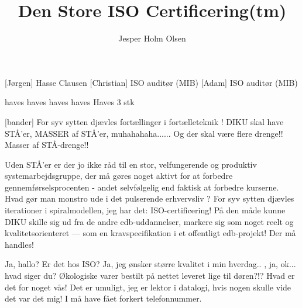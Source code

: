 \documentclass[danish]{article}
\title{Den Store ISO Certificering(tm)}
\author{Jesper Holm Olsen}
\begin{document}
\maketitle

\begin{roles}
  [Jørgen] Hasse Clausen
  [Christian] ISO auditør (MIB)
  [Adam] ISO auditør (MIB)
\end{roles}

\begin{props}
   haves
   haves
   haves
   haves 
   Haves
   3 stk
\end{props}



\begin{sketch}



 [bander] For syv sytten djævles fortællinger i
fortælleteknik ! DIKU skal have STÅ'er, MASSER af
STÅ'er, muhahahaha...... Og der skal være flere drenge!!  Masser af
STÅ-drenge!!


 Uden STÅ'er er der jo ikke råd til en stor, velfungerende
og produktiv systemarbejdsgruppe, der må gøres noget aktivt for at
forbedre gennemførselsprocenten - andet selvfølgelig end faktisk at
forbedre kurserne. Hvad gør man monstro ude i det pulserende
erhvervsliv ?   For syv sytten djævles iterationer i
spiralmodellen, jeg har det: ISO-certificering!  
På den måde kunne DIKU skille sig ud fra de andre edb-uddannelser,
markere sig som noget reelt og kvalitetsorienteret --- som en
kravspecifikation i et offentligt edb-projekt! Der må handles!


 Ja, hallo? Er det hos ISO? Ja, jeg ønsker større kvalitet
i min hverdag.. , ja, ok...
hvad siger du? Økologiske varer bestilt på nettet leveret lige til
døren?!? Hvad er det for
noget vås! Det er umuligt, jeg er lektor i datalogi, hvis nogen skulle vide
det var det mig! I må have fået forkert telefonnummer.



\end{sketch}
\end{document}
